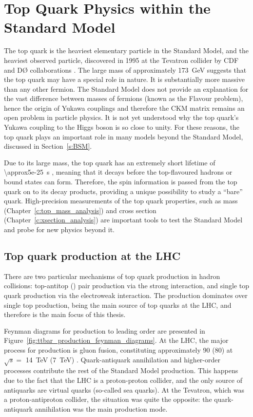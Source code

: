 \section{Top Quark Physics within the Standard Model}
\label{s:top_quak_physics}
The top quark is the heaviest elementary particle in the Standard Model, and the heaviest observed particle, discovered
in 1995 at the Tevatron collider by CDF and D{\O} collaborations \autocite{CDF_top_observation, D0_top_observation}. The
large mass of approximately \SI{173}{\GeV} suggests that the top quark may have a special role in nature. It is
substantially more massive than any other fermion. The Standard Model does not provide an explanation for the vast
difference between masses of fermions (known as the Flavour problem), hence the origin of Yukawa couplings and therefore
the CKM matrix remains an open problem in particle physics. It is not yet understood why the top quark's Yukawa coupling
to the Higgs boson is so close to unity. For these reasons, the top quark plays an important role in many models beyond
the Standard Model, discussed in Section~\ref{s:BSM}.

Due to its large mass, the top quark has an extremely short lifetime of \SI{\approx5e-25}{\s} \autocite{PDG}, meaning
that it decays before the top-flavoured hadrons or \ttbar bound states can form. Therefore, the spin information is
passed from the top quark on to its decay products, providing a unique possibility to study a ``bare'' quark.
High-precision measurements of the top quark properties, such as mass (Chapter~\ref{c:top_mass_analysis}) and cross
section (Chapter~\ref{c:xsection_analysis}) are important tools to test the Standard Model and probe for new physics
beyond it.

\subsection{Top quark production at the LHC}
\label{ss:top_production}
There are two particular mechanisms of top quark production in hadron collisions: top-antitop (\ttbar) pair production
via the strong interaction, and single top quark production via the electroweak interaction. The \ttbar production
dominates over single top production, being the main source of top quarks at the LHC, and therefore is the main focus of
this thesis.

Feynman diagrams for \ttbar production to leading order are presented in
Figure~\ref{fig:ttbar_production_feynman_diagrams}. At the LHC, the major process for \ttbar production is gluon fusion,
constituting approximately \SI{90}{\pc} (\SI{80}{\pc}) at $\sqrt s =$ \SI{14}{\TeV} (\SI{7}{\TeV}) \autocite{PDG}.
Quark-antiquark annihilation and higher-order processes contribute the rest of the Standard Model \ttbar production.
This happens due to the fact that the LHC is a proton-proton collider, and the only source of antiquarks are virtual
quarks (so-called sea quarks). At the Tevatron, which was a proton-antiproton collider, the situation was quite the
opposite: the quark-antiquark annihilation was the main \ttbar production mode.

